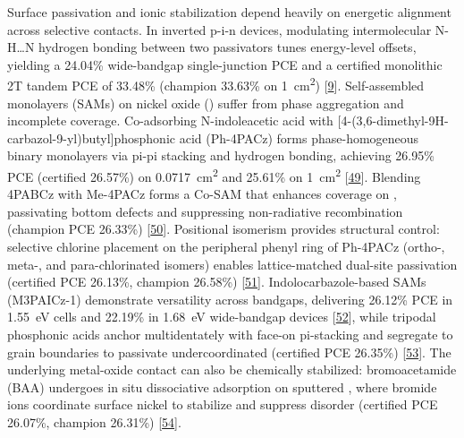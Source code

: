 \documentclass[
  11pt,
]{article}
\begin{document}
Surface passivation and ionic stabilization depend heavily on energetic
alignment across selective contacts. In inverted p-i-n devices,
modulating intermolecular N-H\ldots N hydrogen bonding between two
passivators tunes energy-level offsets, yielding a 24.04\% wide-bandgap
single-junction PCE and a certified monolithic 2T tandem PCE of 33.48\%
(champion 33.63\% on \qty{1}{\centi\meter\squared})
{[}\href{https://doi.org/10.1126/sciadv.aec4431}{9}{]}. Self-assembled
monolayers (SAMs) on nickel oxide () suffer from phase
aggregation and incomplete coverage. Co-adsorbing N-indoleacetic acid
with {[}4-(3,6-dimethyl-9H-carbazol-9-yl)butyl{]}phosphonic acid
(Ph-4PACz) forms phase-homogeneous binary monolayers via pi-pi stacking
and hydrogen bonding, achieving 26.95\% PCE (certified 26.57\%) on
\qty{0.0717}{\centi\meter\squared} and 25.61\% on
\qty{1}{\centi\meter\squared}
{[}\href{https://doi.org/10.1038/s41467-026-71301-6}{49}{]}. Blending
4PABCz with Me-4PACz forms a Co-SAM that enhances coverage on
, passivating bottom defects and suppressing non-radiative
recombination (champion PCE 26.33\%)
{[}\href{https://doi.org/10.1002/eem2.70443}{50}{]}. Positional
isomerism provides structural control: selective chlorine placement on
the peripheral phenyl ring of Ph-4PACz (ortho-, meta-, and
para-chlorinated isomers) enables lattice-matched dual-site passivation
(certified PCE 26.13\%, champion 26.58\%)
{[}\href{https://doi.org/10.1002/adma.202523249}{51}{]}.
Indolocarbazole-based SAMs (M3PAICz-1) demonstrate versatility across
bandgaps, delivering 26.12\% PCE in \qty{1.55}{\electronvolt} cells and
22.19\% in \qty{1.68}{\electronvolt} wide-bandgap devices
{[}\href{https://doi.org/10.1002/smll.202512942}{52}{]}, while tripodal
phosphonic acids anchor multidentately with face-on pi-stacking and
segregate to grain boundaries to passivate undercoordinated 
(certified PCE 26.35\%)
{[}\href{https://doi.org/10.1002/aenm.70806}{53}{]}. The underlying
metal-oxide contact can also be chemically stabilized: bromoacetamide
(BAA) undergoes in situ dissociative adsorption on sputtered ,
where bromide ions coordinate surface nickel to stabilize  and
suppress disorder (certified PCE 26.07\%, champion 26.31\%)
{[}\href{https://doi.org/10.1002/adma.73382}{54}{]}.
\end{document}
